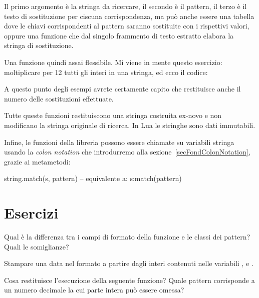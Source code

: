 Il primo argomento è la stringa da ricercare, il secondo è il pattern, il terzo
è il testo di sostituzione per ciscuna corrispondenza, ma può anche essere una
tabella dove le chiavi corrispondenti al pattern saranno sostituite con i
rispettivi valori, oppure una funzione che dal singolo frammento di testo
estratto elabora la stringa di sostituzione.

Una funzione quindi assai flessibile. Mi viene in mente questo esercizio:
moltiplicare per 12 tutti gli interi in una stringa, ed ecco il codice:

A questo punto degli esempi avrete certamente capito che  restituisce
anche il numero delle sostituzioni effettuate.

Tutte queste funzioni restituiscono una stringa costruita ex-novo e non
modificano la stringa originale di ricerca. In Lua le stringhe sono dati
immutabili.

Infine, le funzioni della libreria  possono essere chiamate su
variabili stringa usando la \emph{colon notation} che introdurremo alla
sezione~\ref{secFondColonNotation}, grazie ai metametodi:
\begin{lines}
string.match(s, pattern) -- equivalente a:
s:match(pattern)
\end{lines}


\section{Esercizi}

\begin{Exercise}[label=libstd-01]
Qual è la differenza tra i campi di formato della funzione  e
le classi dei pattern? Quali le somiglianze?
\end{Exercise}

\begin{Exercise}[label=libstd-02]
Stampare una data nel formato  a partire dagli interi contenuti
nelle variabili ,  e .
\end{Exercise}

\begin{Exercise}[label=libstd-03]
Cosa restituisce l'esecuzione della seguente funzione?
Quale pattern corrisponde a un numero decimale la cui parte intera può essere
omessa?
\end{Exercise}

